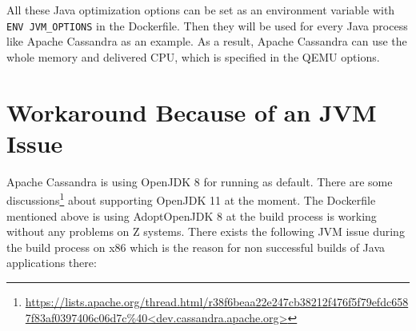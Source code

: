 All these Java optimization options can be set as an environment variable with \lstinline!ENV JVM_OPTIONS! in the Dockerfile. Then they will be used for every Java process like Apache Cassandra as an example.
As a result, Apache Cassandra can use the whole memory and delivered CPU, which is specified in the QEMU options.

\section{Workaround Because of an JVM Issue}

Apache Cassandra is using OpenJDK 8 for running as default. There are some discussions\footnote{\url{https://lists.apache.org/thread.html/r38f6beaa22e247cb38212f476f5f79efdc6587f83af0397406c06d7c\%40<dev.cassandra.apache.org>}} about supporting OpenJDK 11 at the moment. The Dockerfile mentioned above is using AdoptOpenJDK 8 at the build process is working without any problems on Z systems. There exists the following JVM issue during the build process on x86 which is the reason for non successful builds of Java applications there:

